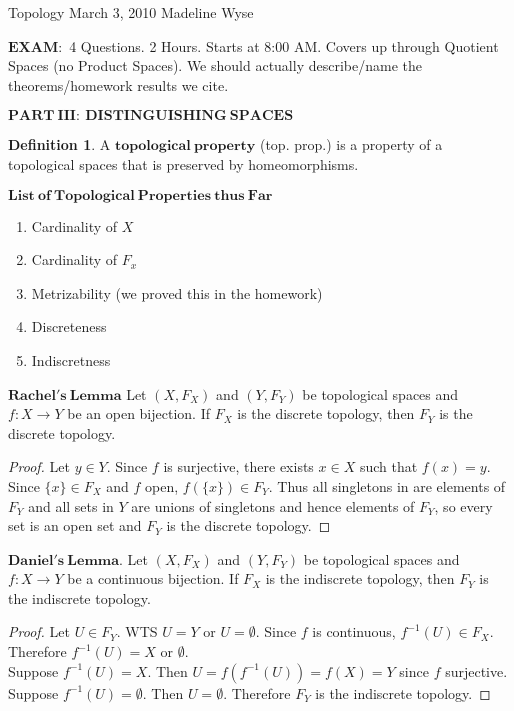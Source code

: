 \documentclass[10pt,reqno]{amsart}
\newtheorem*{Small Fact}{Small Fact}
\newtheorem*{Small Fact about Basis}{Small Fact about Basis}
\newtheorem*{Tiny Fact about Projection Maps}{Tiny Fact about Projection Maps}
\theoremstyle{definition}
\newtheorem*{Definition}{Definition}
\newtheorem{Analogous Theorem}{Analogous Theorem}
\begin{document}
\begin{center}
\huge Topology
March 3, 2010
\normalsize
Madeline Wyse

\vspace{.2in}
$\mathbf{EXAM:}$
4 Questions. 2 Hours. Starts at 8:00 AM.
Covers up through Quotient Spaces (no Product Spaces).
We should actually describe/name the theorems/homework results we cite.
\end{center}
\bigskip
$\mathbf{PART \ III: \ DISTINGUISHING  \ SPACES}$
\begin{Definition}
A $\mathbf{topological \ property}$ (top. prop.) is a property of a topological spaces that is preserved by homeomorphisms. 
\end{Definition}
\begin{center} $\mathbf{List \ of \ Topological \ Properties \ thus \ Far}$ \end{center}
\begin{enumerate}
\item Cardinality of $X$ 
\item Cardinality of $F_x$
\item Metrizability (we proved this in the homework)
\item Discreteness 
\item Indiscretness
\end{enumerate}
\vspace{.1 in}
$\mathbf{Rachel's \ Lemma}$
Let $(X, F_X) $ and $(Y, F_Y)$ be topological spaces and $f: X \rightarrow Y$ be  an open bijection. If $F_X$ is the discrete topology, then $F_Y$ is the discrete topology.
\begin{proof}
Let $y \in Y$. Since $f$ is surjective, there exists $x \in X$ such that $f(x) = y$. Since $\{x\} \in F_X$ and $f$ open, $f(\{x\}) \in F_Y$. Thus all singletons in are elements of $F_Y$ and all sets in $Y$ are unions of singletons and hence elements of $F_Y$, so every set is an open set and $F_Y$ is the discrete topology. 
\end{proof}
$\mathbf{Daniel's \ Lemma}$. 
Let $(X, F_X) $ and $(Y, F_Y)$ be topological spaces and $f: X \rightarrow Y$ be  a continuous bijection. If $F_X$ is the indiscrete topology, then $F_Y$ is the indiscrete topology.
\begin{proof}
Let $U \in F_Y$. WTS $U = Y$ or $U = \emptyset$. Since $f$ is continuous, $f^{-1}(U) \in F_X$. Therefore $f^{-1}(U) = X$ or $\emptyset$. \\
Suppose $f^{-1}(U) = X$. Then $U = f(f^{-1}(U)) = f(X) = Y$ since $f$ surjective.\\
Suppose $f^{-1}(U) = \emptyset$. Then $U = \emptyset$. Therefore $F_Y$ is the indiscrete topology. 
\end{proof}
\end{document}
